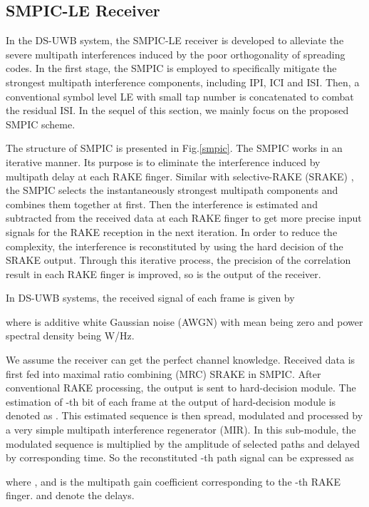 \documentclass[journal]{IEEEtran}
\begin{document}
\subsection{SMPIC-LE Receiver}

In the DS-UWB system, the SMPIC-LE receiver is developed to
alleviate the severe multipath interferences induced by the poor
orthogonality of spreading codes. In the first stage, the SMPIC is
employed to specifically mitigate the strongest multipath
interference components, including IPI, ICI and ISI. Then, a
conventional symbol level LE with small tap number is concatenated
to combat the residual ISI. In the sequel of this section, we mainly
focus on the proposed SMPIC scheme.

The structure of SMPIC is presented in Fig.\ref{smpic}. The SMPIC
works in an iterative manner. Its purpose is to eliminate the
interference induced by multipath delay at each RAKE finger. Similar
with selective-RAKE (SRAKE) \cite{S-RAKE}, the SMPIC selects the
instantaneously strongest  multipath components and combines them
together at first. Then the interference is estimated and subtracted
from the received data at each RAKE finger to get more precise input
signals for the RAKE reception in the next iteration. In order to
reduce the complexity, the interference is reconstituted by using
the hard decision of the SRAKE output. Through this iterative
process, the precision of the correlation result in each RAKE finger
is improved, so is the output of the receiver.

In DS-UWB systems, the received signal of each frame is given by

where  is additive white Gaussian noise (AWGN) with mean being
zero and power spectral density being  W/Hz.

We assume the receiver can get the perfect channel knowledge.
Received data  is first fed into maximal ratio combining (MRC)
SRAKE in SMPIC. After conventional RAKE processing, the output is
sent to hard-decision module. The estimation of -th bit of each
frame at the output of hard-decision module is denoted as
. This estimated sequence is then spread,
modulated and processed by a very simple multipath interference
regenerator (MIR). In this sub-module, the modulated sequence is
multiplied by the amplitude of selected  paths and delayed by
corresponding time. So the reconstituted -th path signal can be
expressed as

where , and  is the multipath
gain coefficient corresponding to the -th RAKE finger. 
and  denote the delays.
\end{document}
